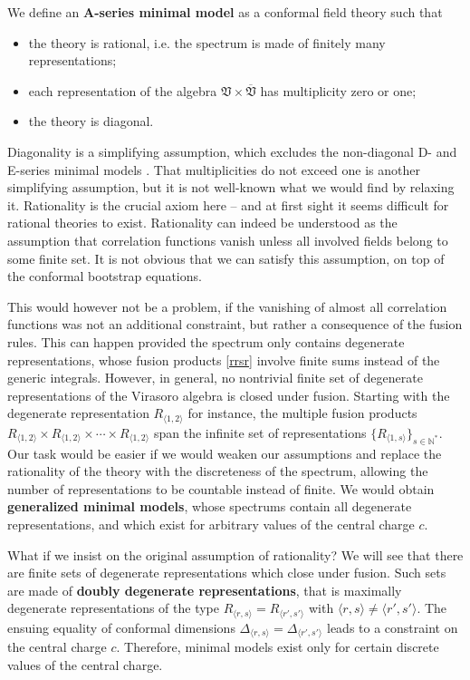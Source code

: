 \documentclass[12pt, a4paper, notitlepage, twoside]{report}
\numberwithin{equation}{section}
\theoremstyle{break}
\begin{document}
We define an \textbf{A-series minimal model} as a conformal field theory such that
\begin{itemize}
\item the theory is rational, i.e.
the spectrum is made of finitely many representations;
\item each representation of the algebra $\mathfrak{V}\times \overline{\mathfrak{V}}$ has multiplicity zero or one;
\item the theory is diagonal.
\end{itemize}
Diagonality is a simplifying assumption, which excludes the non-diagonal D- and E-series minimal models \cite{fms97}.
That multiplicities do not exceed one is another simplifying assumption, but it is not well-known what we would find by relaxing it. 
Rationality is the crucial axiom here -- and at first sight it seems difficult for rational theories to exist.
Rationality can indeed be understood as the assumption that correlation functions vanish unless all involved fields belong to some finite set.
It is not obvious that we can satisfy this assumption, on top of the conformal bootstrap equations.

This would however not be a problem, if the vanishing of almost all correlation functions was not an additional constraint, but rather a consequence of the fusion rules.
This can happen provided the spectrum only contains degenerate representations, whose fusion products \eqref{rrsr} involve finite sums instead of the generic integrals. 
However, in general, no nontrivial finite set of degenerate representations of the Virasoro algebra is closed under fusion.
Starting with the degenerate representation $R_{\langle 1,2 \rangle}$ for instance, the multiple fusion products $R_{\langle 1,2 \rangle}\times R_{\langle 1,2 \rangle}\times \cdots \times R_{\langle 1,2 \rangle}$ span the infinite set of representations $\{R_{\langle 1,s \rangle}\}_{s\in{\mathbb{N}}^*}$.
Our task would be easier if we would weaken our assumptions and replace the rationality of the theory with the discreteness of the spectrum, allowing the number of representations to be countable instead of finite.
We would obtain \textbf{\boldmath generalized minimal models}, whose spectrums contain all degenerate representations, and which exist for arbitrary values of the central charge $c$. 

What if we insist on the original assumption of rationality? We will see that there are finite sets 
of degenerate representations which close under fusion.
Such sets are made of
\textbf{\boldmath doubly degenerate representations}, that is maximally degenerate representations of the type $R_{\langle r,s \rangle}=R_{\langle r',s' \rangle}$ with $\langle r,s \rangle\neq \langle r',s' \rangle$.
The ensuing equality of conformal dimensions $\Delta_{\langle r,s \rangle}=\Delta_{\langle r',s' \rangle}$ leads to a constraint on the central charge $c$.
Therefore, minimal models exist only for certain discrete values of the central charge. 
\end{document}
